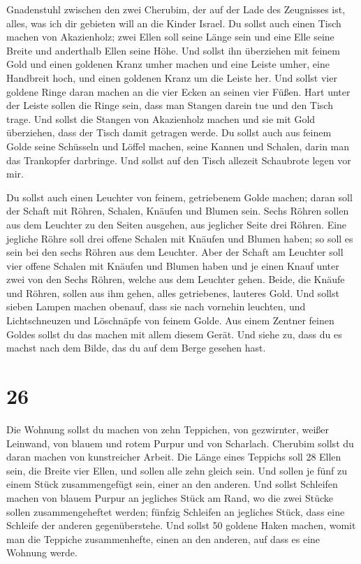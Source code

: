 Gnadenstuhl zwischen den zwei Cherubim, der auf der Lade des Zeugnisses
ist, alles, was ich dir gebieten will an die Kinder Israel.
 Du sollst auch einen Tisch machen von Akazienholz; zwei
Ellen soll seine Länge sein und eine Elle seine Breite und anderthalb
Ellen seine Höhe.  Und sollst ihn überziehen mit feinem
Gold und einen goldenen Kranz umher machen  und eine
Leiste umher, eine Handbreit hoch, und einen goldenen Kranz um die
Leiste her.  Und sollst vier goldene Ringe daran machen
an die vier Ecken an seinen vier Füßen.  Hart unter der
Leiste sollen die Ringe sein, dass man Stangen darein tue und den Tisch
trage.  Und sollst die Stangen von Akazienholz machen und
sie mit Gold überziehen, dass der Tisch damit getragen werde.
 Du sollst auch aus feinem Golde seine Schüsseln und
Löffel machen, seine Kannen und Schalen, darin man das Trankopfer
darbringe.  Und sollst auf den Tisch allezeit Schaubrote
legen vor mir.

 Du sollst auch einen Leuchter von feinem, getriebenem
Golde machen; daran soll der Schaft mit Röhren, Schalen, Knäufen und
Blumen sein.  Sechs Röhren sollen aus dem Leuchter zu den
Seiten ausgehen, aus jeglicher Seite drei Röhren.  Eine
jegliche Röhre soll drei offene Schalen mit Knäufen und Blumen haben; so
soll es sein bei den sechs Röhren aus dem Leuchter.  Aber
der Schaft am Leuchter soll vier offene Schalen mit Knäufen und Blumen
haben  und je einen Knauf unter zwei von den Sechs
Röhren, welche aus dem Leuchter gehen.  Beide, die Knäufe
und Röhren, sollen aus ihm gehen, alles getriebenes, lauteres Gold.
 Und sollst sieben Lampen machen obenauf, dass sie nach
vornehin leuchten,  und Lichtschneuzen und Löschnäpfe von
feinem Golde.  Aus einem Zentner feinen Goldes sollst du
das machen mit allem diesem Gerät.  Und siehe zu, dass du
es machst nach dem Bilde, das du auf dem Berge gesehen hast.

\hypertarget{section-25}{%
\section{26}\label{section-25}}

 Die Wohnung sollst du machen von zehn Teppichen, von
gezwirnter, weißer Leinwand, von blauem und rotem Purpur und von
Scharlach. Cherubim sollst du daran machen von kunstreicher Arbeit.
 Die Länge eines Teppichs soll 28 Ellen sein, die Breite
vier Ellen, und sollen alle zehn gleich sein.  Und sollen
je fünf zu einem Stück zusammengefügt sein, einer an den anderen.
 Und sollst Schleifen machen von blauem Purpur an
jegliches Stück am Rand, wo die zwei Stücke sollen zusammengeheftet
werden;  fünfzig Schleifen an jegliches Stück, dass eine
Schleife der anderen gegenüberstehe.  Und sollst 50
goldene Haken machen, womit man die Teppiche zusammenhefte, einen an den
anderen, auf dass es eine Wohnung werde.

